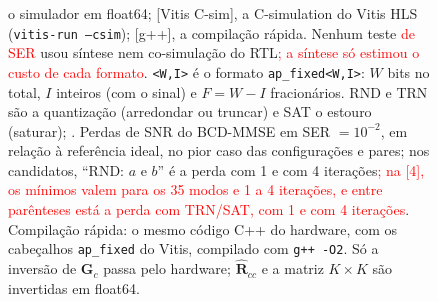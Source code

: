 \begin{figure}[htbp]
{o simulador em float64; [Vitis C-sim], a C-simulation do Vitis HLS (\texttt{vitis-run --csim});
[g++], a compilação rápida. Nenhum teste \textcolor{red}{de SER} usou síntese nem co-simulação do RTL\textcolor{red}{; a síntese só estimou o custo de cada formato}. \texttt{<W,I>} é o formato \texttt{ap\_fixed<W,I>}: $W$ bits no
total, $I$ inteiros (com o sinal) e $F = W - I$ fracionários. RND e TRN são a quantização
(arredondar ou truncar) e SAT o estouro (saturar); \arvoredefinicoes. Perdas de SNR do
BCD-MMSE em SER $= 10^{-2}$, em relação à referência ideal, no pior caso das configurações e
pares; nos candidatos, ``RND: $a$ e $b$'' é a perda com 1 e com 4 iterações\textcolor{red}{; na [4], os mínimos valem para os 35 modos e 1 a 4 iterações, e entre parênteses está a perda com TRN/SAT, com 1 e com 4 iterações}. Compilação rápida: o mesmo código C++ do hardware,
com os cabeçalhos \texttt{ap\_fixed} do Vitis, compilado com \texttt{g++ -O2}. Só a inversão de $\mathbf G_c$ passa
pelo hardware; $\hat{\mathbf R}_{cc}$ e a matriz $K \times K$ são invertidas em float64.}
\end{figure}

